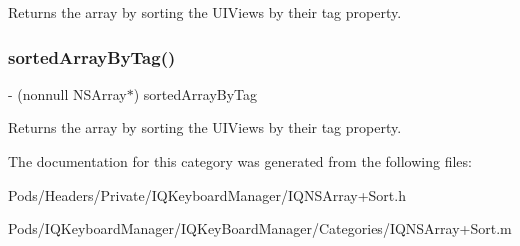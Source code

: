 Returns the array by sorting the U\+I\+View\textquotesingle{}s by their tag property. \mbox{\label{category_n_s_array_07_i_q___n_s_array___sort_08_a72511d078e1e94ab28b218bc84e2f560}} 
\subsubsection{\texorpdfstring{sorted\+Array\+By\+Tag()}{sortedArrayByTag()}\hspace{0.1cm}{\footnotesize\ttfamily [3/3]}}
{\footnotesize\ttfamily -\/ (nonnull N\+S\+Array$\ast$) sorted\+Array\+By\+Tag \begin{DoxyParamCaption}{ }\end{DoxyParamCaption}}

Returns the array by sorting the U\+I\+View\textquotesingle{}s by their tag property. 

The documentation for this category was generated from the following files\+:\begin{DoxyCompactItemize}
\item 
Pods/\+Headers/\+Private/\+I\+Q\+Keyboard\+Manager/I\+Q\+N\+S\+Array+\+Sort.\+h\item 
Pods/\+I\+Q\+Keyboard\+Manager/\+I\+Q\+Key\+Board\+Manager/\+Categories/I\+Q\+N\+S\+Array+\+Sort.\+m\end{DoxyCompactItemize}
